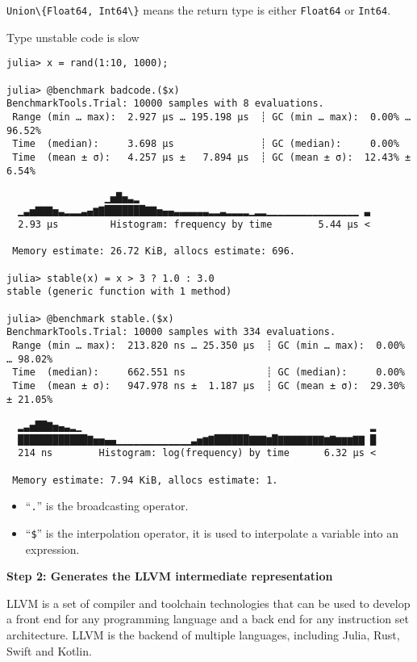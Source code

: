 \documentclass[
  notoc %
]{tufte-book}
\providecommand{\tightlist}{%
  \setlength{\itemsep}{0pt}\setlength{\parskip}{0pt}
}
\newcommand{\passthrough}[1]{#1}
\begin{document}
\passthrough{\lstinline!Union\{Float64, Int64\}!} means the return type
is either \passthrough{\lstinline!Float64!} or
\passthrough{\lstinline!Int64!}.

Type unstable code is slow

\begin{lstlisting}
julia> x = rand(1:10, 1000);

julia> @benchmark badcode.($x)
BenchmarkTools.Trial: 10000 samples with 8 evaluations.
 Range (min … max):  2.927 μs … 195.198 μs  ┊ GC (min … max):  0.00% … 96.52%
 Time  (median):     3.698 μs               ┊ GC (median):     0.00%
 Time  (mean ± σ):   4.257 μs ±   7.894 μs  ┊ GC (mean ± σ):  12.43% ±  6.54%

                 ▁▅█▅▃▂                                        
  ▁▃▅▇▇▇▅▃▂▂▂▃▄▆▇███████▇▇▅▄▄▃▃▃▃▃▃▂▂▃▂▂▂▂▁▂▂▁▁▁▁▁▁▁▁▁▁▁▁▁▁▁▁ ▃
  2.93 μs         Histogram: frequency by time        5.44 μs <

 Memory estimate: 26.72 KiB, allocs estimate: 696.

julia> stable(x) = x > 3 ? 1.0 : 3.0
stable (generic function with 1 method)

julia> @benchmark stable.($x)
BenchmarkTools.Trial: 10000 samples with 334 evaluations.
 Range (min … max):  213.820 ns … 25.350 μs  ┊ GC (min … max):  0.00% … 98.02%
 Time  (median):     662.551 ns              ┊ GC (median):     0.00%
 Time  (mean ± σ):   947.978 ns ±  1.187 μs  ┊ GC (mean ± σ):  29.30% ± 21.05%

  ▂▃▅██▇▅▄▃▂▁                                                  ▂
  ████████████▇▅▅▄▄▁▁▁▁▁▁▁▁▁▁▁▁▁▃▅▆▇██████▇▇▇▆█▇▇▇▇▇▇▇▇▆▇▆▆▆▇▇ █
  214 ns        Histogram: log(frequency) by time      6.32 μs <

 Memory estimate: 7.94 KiB, allocs estimate: 1.
\end{lstlisting}

\begin{itemize}
\tightlist
\item
  ``\passthrough{\lstinline!.!}'' is the broadcasting operator.
\item
  ``\passthrough{\lstinline!$!}'' is the interpolation operator, it is
  used to interpolate a variable into an expression.
\end{itemize}

\textbf{Step 2: Generates the LLVM intermediate representation}

LLVM is a set of compiler and toolchain technologies that can be used to
develop a front end for any programming language and a back end for any
instruction set architecture. LLVM is the backend of multiple languages,
including Julia, Rust, Swift and Kotlin.
\end{document}
